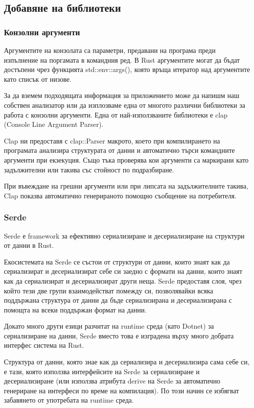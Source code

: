 \subsection{Добавяне на библиотеки}

\subsubsection{Конзолни аргументи}
Аргументите на конзолата са параметри, предавани на програма преди изпълнение
на поргамата в командния ред. В Rust аргументите могат да бъдат достъпени чрез
функцията std::env::args(), която връща итератор над аргументите като списък от
низове.

За да вземем подходящата информация за приложението може да напишм наш собствен
анализатор или да изплозваме една от многото различни библиотеки за работа с
конзолни аргументи. Една от най-използваните библиотеки е clap (Console Line
Argument Parser).

Clap ни предоставя с clap::Parser макрото, което при компилирането на програмата
анализира структурата от данни и автоматично търси командните аргументи при екзекуция.
Също тъка проверява кои аргументи са маркирани като задължителни или такива със
стойност по подразбиране.

При въвеждане на грешни аргументи или при липсата на задължителните такива, Clap
показва автоматично генерираното помощно съобщение на потребителя.


\subsubsection{Serde}
Serde е framework за ефективно сериализиране и десериализиране на структури от данни в Rust.

Екосистемата на Serde се състои от структури от данни, които знаят как да
сериализират и десериализират себе си заедно с формати на данни, които знаят
как да сериализират и десериализират други неща. Serde предоставя слоя, чрез
който тези две групи взаимодействат помежду си, позволявайки всяка поддържана
структура от данни да бъде сериализирана и десериализирана с помощта на всеки
поддържан формат на данни.

Докато много други езици разчитат на runtime среда (като Dotnet) за
сериализиране на данни, Serde вместо това е изградена върху много добрата
интерфес система на Rust.

Структура от данни, която знае как да сериализира и десериализира сама себе си,
е тази, която използва интерфейсите на Serde за сериализиране и десериализиране
(или използва атрибута derive на Serde за автоматично генериране на интерфеси
по време на компилация). По този начин се избягват забавянето от употребата на
runtime среда.

